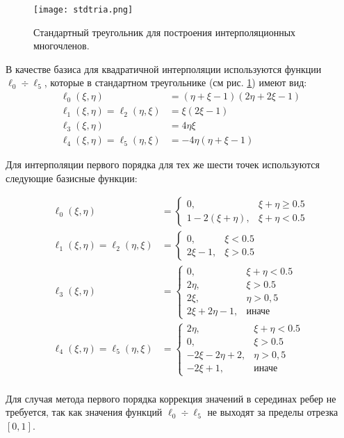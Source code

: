 \begin{figure}[ht!]
\centering
\texttt{[image: stdtria.png]}
\caption{Стандартный треугольник для построения интерполяционных многочленов.}
\label{fig:stdtria}
\end{figure}
В качестве базиса для квадратичной интерполяции используются функции $\ell_0 \div \ell_5$, которые в стандартном треугольнике (см рис. \ref{fig:stdtria}) имеют вид:
\begin {equation}
\begin {aligned}
\ell_0 (\xi, \eta)&= (\eta + \xi -1)(2\eta + 2\xi - 1) \\
\ell_1 (\xi, \eta) = \ell_2 (\eta, \xi)&= \xi(2\xi - 1) \\
\ell_3 (\xi, \eta)&= 4\eta\xi \\
\ell_4 (\xi, \eta) = \ell_5(\eta, \xi)&= -4\eta(\eta + \xi - 1)
\end {aligned}
\end {equation}

Для интерполяции первого порядка для тех же шести точек используются следующие базисные функции:

\begin {equation}
\begin {aligned}
\ell_0 (\xi, \eta) &= 
\begin{cases}
0, & \xi + \eta \geqslant 0.5 \\
1-2(\xi + \eta), & \xi + \eta < 0.5
\end{cases}
 \\
\ell_1 (\xi, \eta) = \ell_2 (\eta, \xi) &= 
\begin{cases}
0, & \xi < 0.5 \\
2\xi - 1, & \xi > 0.5
\end{cases}
\\
\ell_3 (\xi, \eta) &=
\begin{cases}
0, & \xi + \eta < 0.5 \\
2\eta, & \xi > 0.5 \\
2\xi, &\eta > 0,5 \\
2\xi + 2\eta - 1, & \text{иначе}
\end{cases}
\\
\ell_4 (\xi, \eta) = \ell_5(\eta, \xi)&= 
\begin{cases}
2\eta, & \xi + \eta < 0.5 \\
0, & \xi > 0.5 \\
-2\xi -2\eta + 2, &\eta > 0,5 \\
-2\xi + 1, & \text{иначе}
\end{cases}
\\
\end {aligned}
\end {equation}

Для случая метода первого порядка коррекция значений в серединах ребер не требуется, так как значения функций $\ell_0 \div \ell_5$ не выходят за пределы отрезка $[0, 1]$.